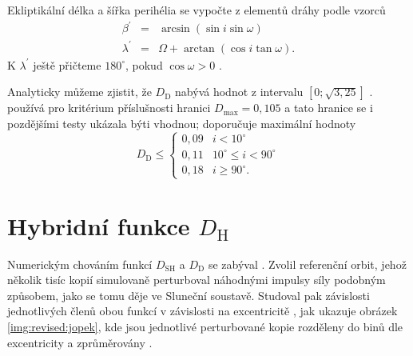Ekliptikální délka a šířka perihélia se vypočte z elementů dráhy podle vzorců \cite{cometassoc}
\begin{eqnarray}
    \beta^\prime &=& \arcsin{\left( \sin{i}\sin{\omega} \right)}\\
    \lambda^\prime &=& \Omega + \arctan{\left( \cos{i}\tan{\omega} \right)} \text{.}
\end{eqnarray}
K $\lambda^\prime$ ještě přičteme $180^\circ$, pokud $\cos{\omega}>0$ \cite{cometassoc}.

\smallskip

Analyticky můžeme zjistit, že $D_\text{D}$ nabývá hodnot z intervalu $\left[ 0;\sqrt{3{,}25} \right]$ \cite{cometassoc}. \citeauthor{cometassoc} používá pro kritérium příslušnosti hranici $D_\text{max}=0{,}105$ \cite{cometassoc} a tato hranice se i pozdějšími testy ukázala býti vhodnou; \cite{galligan} doporučuje maximální hodnoty
$$
    D_\text{D} \le \begin{cases}
        0{,}09 & i < 10^\circ             \\
        0{,}11 & 10^\circ\le i < 90^\circ \\
        0{,}18 & i \ge 90^\circ \text{.}  %
    \end{cases}
$$

\section{Hybridní funkce $D_\text{H}$}%
Numerickým chováním funkcí $D_\text{SH}$ a $D_\text{D}$ se zabýval \citeauthor{remarks}. Zvolil referenční orbit, jehož několik tisíc kopií simulovaně perturboval náhodnými impulsy síly podobným způsobem, jako se tomu děje ve Sluneční soustavě. Studoval pak závislosti jednotlivých členů obou funkcí v závislosti na excentricitě \cite{remarks}, jak ukazuje obrázek \ref{img:revised:jopek}, kde jsou jednotlivé perturbované kopie rozděleny do binů dle excentricity a zprůměrovány \cite{remarks}.

